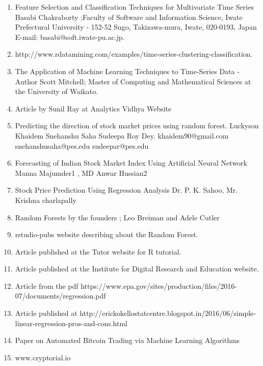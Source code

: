 \documentclass{article}
\begin{document}
\begin{enumerate}

\item Feature Selection and Classification Techniques for Multivariate Time Series
Basabi Chakraborty ;Faculty of Software and Information Science, Iwate Prefectural University - 152-52 Sugo, Takizawa-mura, Iwate, 020-0193, Japan E-mail: basabi@soft.iwate-pu.ac.jp.\newline

\item http://www.rdatamining.com/examples/time-series-clustering-classification.\newline

\item The Application of Machine Learning Techniques to Time-Series Data - Author Scott Mitchell; Master of Computing and Mathematical Sciences at the University of Waikato. \newline

\item Article by Sunil Ray at Analytics Vidhya Website

\item Predicting the direction of stock market prices using random forest. Luckyson Khaidem Snehanshu Saha Sudeepa Roy Dey. khaidem90@gmail.com snehanshusaha@pes.edu sudeepar@pes.edu

\item Forecasting of Indian Stock Market Index Using Artificial Neural Network Manna Majumder1 , MD Anwar Hussian2

\item Stock Price Prediction Using Regression Analysis Dr. P. K. Sahoo, Mr. Krishna charlapally

\item Random Forests by the founders ; Leo Breiman and Adele Cutler

\item rstudio-pubs website describing about the Random Forest.

\item Article published at the Tutor website for R tutorial.


\item Article published at the Institute for Digital Research and Education website.

\item Article from the pdf https://www.epa.gov/sites/production/files/2016-07/documents/regression.pdf

\item Article published at http://erickokellostatcentre.blogspot.in/2016/06/simple-linear-regression-pros-and-cons.html

\item Paper on Automated Bitcoin Trading via Machine Learning Algorithms 

\item www.cryptorial.io

\end{enumerate}
\end{document}
